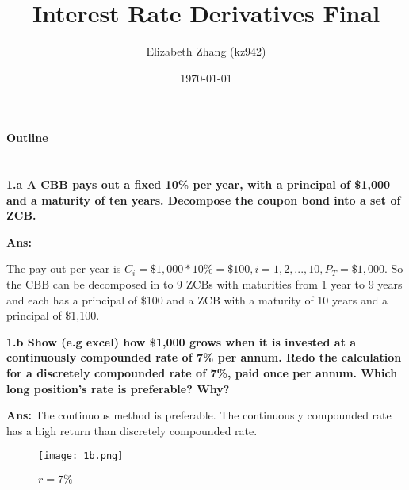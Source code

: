 \documentclass[11pt, notitlepage]{article}
\title{Interest Rate Derivatives Final}
\author{Elizabeth Zhang (kz942)}
\date{\today}
\def\\ln{\mathrm{\ln}}
\def\\exp{\mathrm{\exp}}
\def\\max{\mathrm{\max}}
\begin{document}
\maketitle
{\centering
  \textbf {Outline}\par
}
\begin{table}[H]
\centering
{}
\end{table}
\newpage
\section{}
\color{red}
\textbf {1.a  A CBB pays out a fixed 10\% per year, with a principal of \$1,000 and a maturity of ten years. Decompose the coupon bond into a set of ZCB.}

\vspace{5mm}
\color{black}
\textbf {Ans:}


The pay out per year is $C_i = \$1,000 * 10\% = \$100, i = 1,2,...,10, P_T = \$1,000 $. So the CBB can be decomposed in to 9 ZCBs with maturities from 1 year to 9 years and each has a principal of \$100 and a ZCB with a maturity of 10 years and a principal of \$1,100.

\color{red}
\vspace{5mm}
\textbf {1.b  Show (e.g excel) how \$1,000 grows when it is invested at a continuously compounded rate of 7\% per annum. Redo the calculation for a discretely compounded rate of 7\%, paid once per annum. Which long position’s rate is preferable? Why?}

\color{black}
\vspace{5mm}
\textbf {Ans:}
The continuous method is preferable. The continuously compounded rate has a high return than discretely compounded rate.
\begin{figure}[h!]
\centering
  \texttt{[image: 1b.png]}
  \caption{$r = 7\%$}
  \label{1b}
\end{figure}
\end{document}
